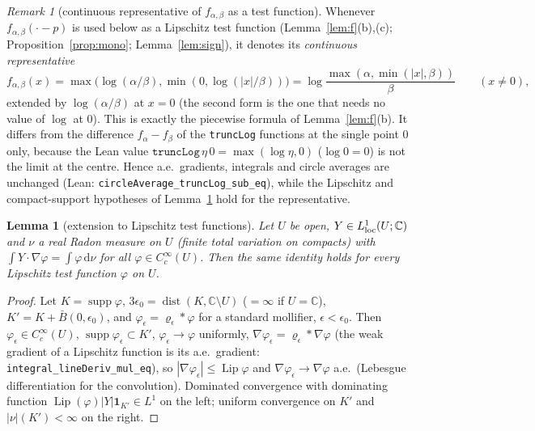 \documentclass[11pt]{article}
\newtheorem{lemma}[theorem]{Lemma}
\theoremstyle{definition}
\theoremstyle{remark}
\newtheorem*{remarkun}{Remark}%
\newcommand{\C}{\mathbb C}
\newcommand{\dd}{\,\mathrm d}
\DeclareMathOperator{\dist}{dist}
\DeclareMathOperator{\supp}{supp}
\begin{document}
\begin{remarkun}[continuous representative of $f_{\alpha,\beta}$ as a test function]\label{rem:contrep}
Whenever $f_{\alpha,\beta}(\cdot-p)$ is used below as a Lipschitz test function (Lemma~\ref{lem:f}(b),(c); Proposition~\ref{prop:mono}; Lemma~\ref{lem:sign}), it
denotes its \emph{continuous representative}
\[
f_{\alpha,\beta}(x)=\max\bigl(\log(\alpha/\beta),\min(0,\log(|x|/\beta))\bigr)=\log\frac{\max(\alpha,\min(|x|,\beta))}{\beta}\qquad(x\ne0),
\]
extended by $\log(\alpha/\beta)$ at $x=0$ (the second form is the one that needs no value of $\log$ at $0$). This is exactly the piecewise formula of Lemma~\ref{lem:f}(b).
It differs from the difference $f_\alpha-f_\beta$ of the \texttt{truncLog} functions at the single point $0$ only, because the Lean value
$\texttt{truncLog}\,\eta\,0=\max(\log\eta,0)$ ($\log0=0$) is not the limit at the centre. Hence a.e.\ gradients, integrals and circle averages
are unchanged (Lean: \texttt{circleAverage\_truncLog\_sub\_eq}), while the Lipschitz and compact-support hypotheses of Lemma~\ref{lem:moll} hold for the representative.
\end{remarkun}

\begin{lemma}[extension to Lipschitz test functions]\label{lem:moll}
Let $U$ be open, $Y\in L^1_{\rm loc}(U;\C)$ and $\nu$ a real Radon measure on $U$ (finite total variation on compacts)
with $\int Y\cdot\nabla\varphi=\int\varphi\dd\nu$ for all $\varphi\in C^\infty_c(U)$. Then the same identity holds for every
Lipschitz test function $\varphi$ on $U$.
\end{lemma}
\begin{proof}
Let $K=\supp\varphi$, $3\epsilon_0=\dist(K,\C\setminus U)$ ($=\infty$ if $U=\C$), $K'=K+\bar B(0,\epsilon_0)$, and
$\varphi_\epsilon=\varrho_\epsilon*\varphi$ for a standard mollifier, $\epsilon<\epsilon_0$. Then $\varphi_\epsilon\in C_c^\infty(U)$,
$\supp\varphi_\epsilon\subset K'$, $\varphi_\epsilon\to\varphi$ uniformly, $\nabla\varphi_\epsilon=\varrho_\epsilon*\nabla\varphi$ (the weak gradient
of a Lipschitz function is its a.e.\ gradient: \texttt{integral\_lineDeriv\_mul\_eq}), so $|\nabla\varphi_\epsilon|\le\operatorname{Lip}\varphi$ and
$\nabla\varphi_\epsilon\to\nabla\varphi$ a.e.\ (Lebesgue differentiation for the convolution). Dominated convergence with
dominating function $\operatorname{Lip}(\varphi)|Y|\mathbf 1_{K'}\in L^1$ on the left; uniform convergence on $K'$ and
$|\nu|(K')<\infty$ on the right.
\end{proof}
\end{document}
